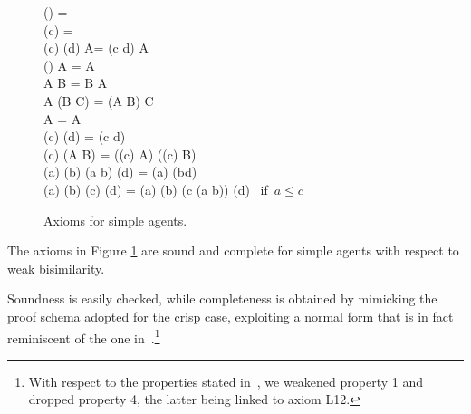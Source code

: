 \documentclass[main.tex]{subfiles}
\begin{document}
	\setcounter{equation}{0}


\begin{figure}
\scriptsize
	\begin{flalign}
\tell(\bot) = \ostop\label{eq:stop1}\\
\ask(c) \rarrow \ostop= \ostop\label{eq:stop2}\\
\ask(c) \rarrow \ask(d) \rarrow A= \ask(c \vee d) \rarrow A\label{eq:ask1}\\
\ask(\bot) \rarrow A = A\label{eq:ask2}\\
A \parallel B = B \parallel A\label{eq:parall1}\\
A \parallel (B \parallel C) = (A \parallel B) \parallel C\label{eq:parall2}\\
A \parallel \ostop = A\label{eq:parall3}\\
\tell(c) \parallel \tell(d) =  \tell(c \otimes d)\label{eq:tell1}\\
\ask(c) \rarrow (A \parallel B) = (\ask(c) \rarrow A) \parallel (\ask(c) \rarrow B)\label{eq:dis1}\\
\ask(a) \rarrow \tell(b) \parallel \ask(a \otimes b) \rarrow \tell(d) = \ask(a) \rarrow \tell(b\otimes d)\label{eq:dis2}\\
\ask(a) \rarrow \tell(b) \parallel \ask(c) \rarrow \tell(d) = \ask(a) \rarrow \tell(b) \parallel \ask(c \vee (a \otimes b)) \rarrow \tell(d) \mbox{ if $a \leq c$}\label{eq:dis3}
	\end{flalign}
\caption{Axioms for simple agents.}\label{fig:axioms2}
\end{figure}

\setcounter{equation}{8}


\begin{proposition}
The axioms in Figure \ref{fig:axioms2} are sound and complete for simple agents with respect to weak bisimilarity.
\end{proposition}

Soundness is easily checked, while completeness is obtained by mimicking the proof schema adopted for the crisp case, 
exploiting  a normal form that is in fact reminiscent of the one in~\cite[Definition 3.2]{popl91}.\footnote{With respect to the properties 
stated in~\cite[p.342]{popl91}, we weakened property 1 and dropped property 4, the latter being linked to axiom L12.}
\end{document}
